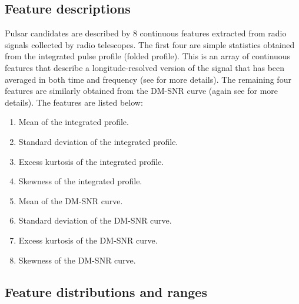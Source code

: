 \documentclass[12pt,a4paper]{article}
\begin{document}
\subsection{Feature descriptions}

Pulsar candidates are described by 8 continuous features extracted from radio signals collected by radio telescopes.
The first four are simple statistics obtained from the integrated pulse profile (folded profile).
This is an array of continuous features that describe a longitude-resolved version of the signal that has been averaged in both time and frequency (see \cite{Lyon2016} for more details).
The remaining four features are similarly obtained from the DM-SNR curve (again see \cite{Lyon2016} for more details).
The features are listed below:

\begin{enumerate}
    \item Mean of the integrated profile.
    \item Standard deviation of the integrated profile.
    \item Excess kurtosis of the integrated profile.
    \item Skewness of the integrated profile.
    \item Mean of the DM-SNR curve.
    \item Standard deviation of the DM-SNR curve.
    \item Excess kurtosis of the DM-SNR curve.
    \item Skewness of the DM-SNR curve.
\end{enumerate}

\subsection{Feature distributions and ranges}
\end{document}
